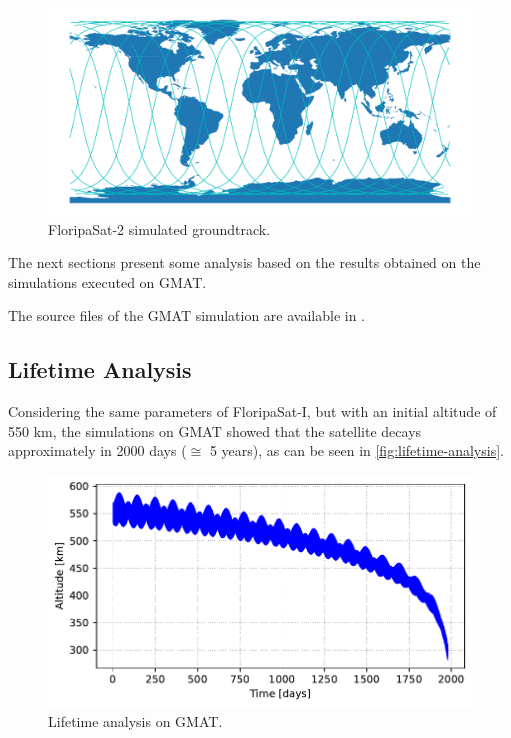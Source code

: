 \begin{figure}[!ht]
    \begin{center}
        \includegraphics[width=\textwidth]{figures/fsat2-gmat-groundtrack.pdf}
        \caption{FloripaSat-2 simulated groundtrack.}
        \label{fig:fsat2-gmat-groundtrack}
    \end{center}
\end{figure}

The next sections present some analysis based on the results obtained on the simulations executed on GMAT.

The source files of the GMAT simulation are available in \cite{fsat2-mechanical}.

\subsection{Lifetime Analysis}

Considering the same parameters of FloripaSat-I, but with an initial altitude of 550 km, the simulations on GMAT showed that the satellite decays approximately in 2000 days ($\cong$ 5 years), as can be seen in \autoref{fig:lifetime-analysis}.

\begin{figure}[!ht]
    \begin{center}
        \includegraphics[width=\textwidth]{curves/lifetime.pdf}
        \caption{Lifetime analysis on GMAT.}
        \label{fig:lifetime-analysis}
    \end{center}
\end{figure}

